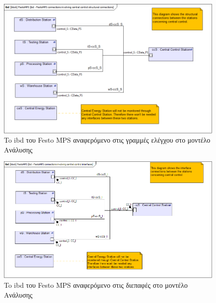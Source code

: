 \documentclass[a4paper,12pt,twoside]{report}
\begin{document}
\begin{appendices}
			\begin{figure}[hp]
					\centering
					\includegraphics[scale=0.30]{AnalysisModel_ibd-FestoMPSconnectionsinvolvingcentralcontrolstructuralconnections.png}
					\caption{To ibd του Festo MPS αναφερόμενο στις γραμμές ελέγχου στο μοντέλο Ανάλυσης}
					\label{φωτ:To ibd του Festo MPS αναφερόμενο στις γραμμές ελέγχου στο μοντέλο Ανάλυσης}
			\end{figure}
			
			\begin{figure}[hp]
					\centering
					\includegraphics[scale=0.30]{AnalysisModel_ibd-FestoMPSconnectionsinvolvingcentralcontrolinterfaces.png}
					\caption{To ibd του Festo MPS αναφερόμενο στις διεπαφές στο μοντέλο Ανάλυσης}
					\label{φωτ:To ibd του Festo MPS αναφερόμενο στις διεπαφές στο μοντέλο Ανάλυσης}
			\end{figure}
			

\end{appendices}
\end{document}
